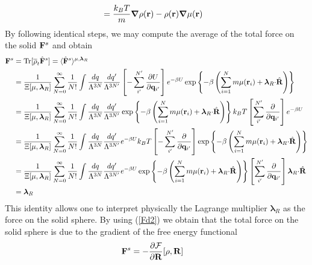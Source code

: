 \documentclass[b5paper,openright,11pt]{book}
\begin{document}
\begin{appendices}
\begin{align}
\nonumber\\
&=\frac{k_BT}{m}\boldsymbol{\nabla} \rho({\bf r})
-\rho({\bf r})\boldsymbol{\nabla}\mu({\bf r})
\label{fllr}
\end{align}
By following identical steps, we may compute the average of the total force on the solid ${\bf F}^s$
and obtain
\begin{align}
{\bf F}^s&={\rm Tr}[\overline{\rho}_t \hat{\bf F}^s]=
 \langle \hat{\bf F}^s\rangle^{\mu,\boldsymbol{\lambda}_R} 
\nonumber\\
&=\frac{1}{\Xi[\mu,\boldsymbol{\lambda}_R]}
 \sum_{N=0}^\infty \frac{1}{N!}
\int \frac{dq}{\Lambda^{3N}}\frac{dq'}{\Lambda^{3N'}}
\left[-\sum^{N'}_{i'}\frac{\partial U}{\partial {\bf q}_{i'}}\right]
e^{-\beta U}
\exp\left\{-\beta  \left(\sum_{i=1}^N m\mu({\bf
    r}_i)+ \boldsymbol{\lambda}_R{\cdot}\hat{\bf R}\right)\right\}
\nonumber\\
&=
\frac{1}{\Xi[\mu,\boldsymbol{\lambda}_R]}
 \sum_{N=0}^\infty \frac{1}{N!}
\int \frac{dq}{\Lambda^{3N}}\frac{dq'}{\Lambda^{3N'}}
\exp\left\{-\beta  \left(\sum_{i=1}^N m\mu({\bf
    r}_i)+ \boldsymbol{\lambda}_R{\cdot}\hat{\bf R}\right)\right\}
k_BT\left[\sum^{N'}_{i'}\frac{\partial }{\partial {\bf q}_{i'}}\right]e^{-\beta U}
\nonumber\\
&=
\frac{1}{\Xi[\mu,\boldsymbol{\lambda}_R]}
 \sum_{N=0}^\infty \frac{1}{N!}
\int \frac{dq}{\Lambda^{3N}}\frac{dq'}{\Lambda^{3N'}}
e^{-\beta U}
k_BT\left[-\sum^{N'}_{i'}\frac{\partial }{\partial {\bf q}_{i'}}\right]\exp\left\{-\beta  \left(\sum_{i=1}^N m\mu({\bf
    r}_i)+ \boldsymbol{\lambda}_R{\cdot}\hat{\bf R}\right)\right\}
\nonumber\\
&=
\frac{1}{\Xi[\mu,\boldsymbol{\lambda}_R]}
 \sum_{N=0}^\infty \frac{1}{N!}
\int \frac{dq}{\Lambda^{3N}}\frac{dq'}{\Lambda^{3N'}}
e^{-\beta U}
\exp\left\{-\beta  \left(\sum_{i=1}^N m\mu({\bf
    r}_i)+ \boldsymbol{\lambda}_R{\cdot}\hat{\bf R}\right)\right\}
\left[\sum^{N'}_{i'}\frac{\partial }{\partial {\bf q}_{i'}}\right] \boldsymbol{\lambda}_R{\cdot}\hat{\bf R}
\nonumber\\
&=\boldsymbol{\lambda}_R
\label{lf}\end{align}
This  identity  allows  one  to  interpret  physically  the  Lagrange
multiplier $\boldsymbol{\lambda}_R$ as the  force on the solid sphere.
By  using (\ref{Fd2})  we obtain  that the  total force  on the  solid
sphere is due to the gradient of the free energy functional
\begin{align}
{\bf F}^s&=-\frac{\partial  {\cal F}}{\partial{\bf R}}[\rho,{\bf R}]
\label{Fls}
\end{align}


\end{appendices}
\end{document}
